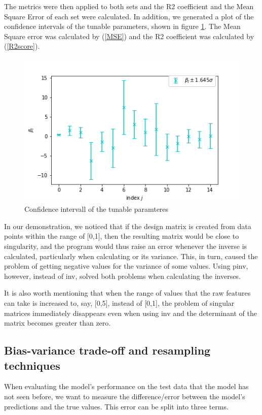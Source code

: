 \documentclass{article}
\begin{document}
The metrics were then applied to both sets and the R2 coefficient and the Mean Square Error of each set were calculated. In addition, we generated a plot of the confidence intervals of the tunable parameters, shown in figure \ref{fig:confintOLS}. The Mean Square error was calculated by (\ref{MSE}) and the R2 coefficient was calculated by (\ref{R2score}).
\begin{figure}
\includegraphics[scale=0.5]{Plots/confidenceintervall.png}
\centering
\caption{Confidence intervall of the tunable paramteres}
\label{fig:confintOLS}
\end{figure}
In our demonstration, we noticed that if the design matrix is created from data points within the range of [0,1], then the resulting  matrix would be close to singularity, and the program would thus raise an error whenever the inverse is calculated, particularly when calculating  or its variance. This, in turn, caused the problem of getting negative values for the variance of some values. Using pinv, however, instead of inv, solved both problems when calculating the inverses.

It is also worth mentioning that when the range of values that the raw features can take is increased to, say, [0,5], instead of [0,1], the problem of singular matrices immediately disappears even when using inv and the determinant of the matrix  becomes greater than zero.



\subsection{Bias-variance trade-off and resampling techniques}
When evaluating the model’s performance on the test data that the model has not seen before, we want to measure the difference/error between the model’s predictions and the true values. This error can be split into three terms.
\end{document}
